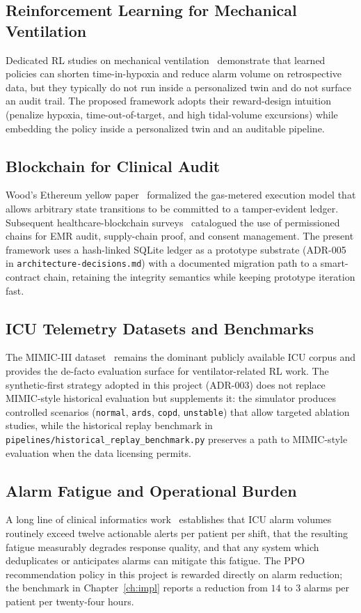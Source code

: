 \documentclass[12pt,a4paper,oneside]{report}
\begin{document}
\subsection{Reinforcement Learning for Mechanical Ventilation}
Dedicated RL studies on mechanical ventilation~\cite{kondrup2023} demonstrate that learned policies can shorten time-in-hypoxia and reduce alarm volume on retrospective data, but they typically do not run inside a personalized twin and do not surface an audit trail. The proposed framework adopts their reward-design intuition (penalize hypoxia, time-out-of-target, and high tidal-volume excursions) while embedding the policy inside a personalized twin and an auditable pipeline.

\subsection{Blockchain for Clinical Audit}
Wood's Ethereum yellow paper~\cite{wood2014} formalized the gas-metered execution model that allows arbitrary state transitions to be committed to a tamper-evident ledger. Subsequent healthcare-blockchain surveys~\cite{agbo2019} catalogued the use of permissioned chains for EMR audit, supply-chain proof, and consent management. The present framework uses a hash-linked SQLite ledger as a prototype substrate (ADR-005 in \texttt{architecture-decisions.md}) with a documented migration path to a smart-contract chain, retaining the integrity semantics while keeping prototype iteration fast.

\subsection{ICU Telemetry Datasets and Benchmarks}
The MIMIC-III dataset~\cite{johnson2016} remains the dominant publicly available ICU corpus and provides the de-facto evaluation surface for ventilator-related RL work. The synthetic-first strategy adopted in this project (ADR-003) does not replace MIMIC-style historical evaluation but supplements it: the simulator produces controlled scenarios (\texttt{normal}, \texttt{ards}, \texttt{copd}, \texttt{unstable}) that allow targeted ablation studies, while the historical replay benchmark in \texttt{pipelines/historical\_replay\_benchmark.py} preserves a path to MIMIC-style evaluation when the data licensing permits.

\subsection{Alarm Fatigue and Operational Burden}
A long line of clinical informatics work~\cite{sendelbach2013} establishes that ICU alarm volumes routinely exceed twelve actionable alerts per patient per shift, that the resulting fatigue measurably degrades response quality, and that any system which deduplicates or anticipates alarms can mitigate this fatigue. The PPO recommendation policy in this project is rewarded directly on alarm reduction; the benchmark in Chapter~\ref{ch:impl} reports a reduction from $14$ to $3$ alarms per patient per twenty-four hours.
\end{document}
